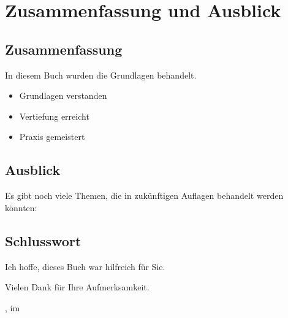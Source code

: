 
\chapter{Zusammenfassung und Ausblick}

\section{Zusammenfassung}

In diesem Buch wurden die Grundlagen behandelt.

\blindtext

\begin{itemize}
	\item Grundlagen verstanden
	\item Vertiefung erreicht
	\item Praxis gemeistert
\end{itemize}

\section{Ausblick}

Es gibt noch viele Themen, die in zukünftigen Auflagen behandelt werden könnten:

\blindtext

\section{Schlusswort}

Ich hoffe, dieses Buch war hilfreich für Sie.

\bigskip

Vielen Dank für Ihre Aufmerksamkeit.

\vfill

\myLocation, im \myYear

\myName
